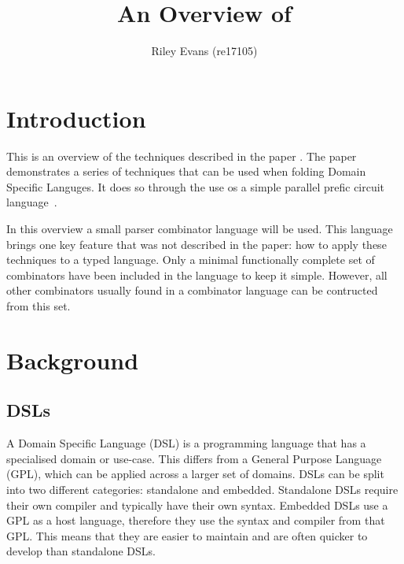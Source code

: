 \documentclass[a4paper, twocolumn, 10pt]{extarticle}
\title{\vspace{-10mm}An Overview of \textit{\citefield{embedding}{title}}\vspace{-4mm}}
\author{Riley Evans (re17105)}
\date{\vspace{-3mm}}
\begin{document}
\maketitle


\section{Introduction}

This is an overview of the techniques described in the paper \textit{}.
The paper demonstrates a series of techniques that can be used when folding Domain Specific Languges.
It does so through the use os a simple parallel prefic circuit language~\cite{scans}.


In this overview a small parser combinator language will be used.
This language brings one key feature that was not described in the paper: how to apply these techniques to a typed language.
Only a minimal functionally complete set of combinators have been included in the language to keep it simple.
However, all other combinators usually found in a combinator language can be contructed from this set.










\section{Background}

\subsection{DSLs}

A Domain Specific Language (DSL) is a programming language that has a specialised domain or use-case.
This differs from a General Purpose Language (GPL), which can be applied across a larger set of domains.
DSLs can be split into two different categories: standalone and embedded. Standalone DSLs require their own compiler and typically have their own syntax.
Embedded DSLs use a GPL as a host language, therefore they use the syntax and compiler from that GPL.
This means that they are easier to maintain and are often quicker to develop than standalone DSLs.
\end{document}
